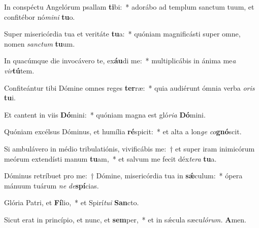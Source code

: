 \item In conspéctu Angelórum psallam \textbf{ti}bi:~* adorábo ad templum sanctum tuum, et confitébor nó\textit{mini} \textbf{tu}o.
\item Super misericórdia tua et veritáte \textbf{tu}a:~* quóniam magnificásti super omne, nomen \textit{sanctum} \textbf{tu}um.
\item In quacúmque die invocávero te, ex\textbf{áu}di me:~* multiplicábis in ánima me\hspace*{0.03em}\textit{a} \textit{vir}\textbf{tú}tem.
\item Confiteántur tibi Dómine omnes reges \textbf{ter}ræ:~* quia audiérunt ómnia verba \textit{oris} \textbf{tu}i.
\item Et cantent in viis \textbf{Dó}mini:~* quóniam magna est gló\textit{ria} \textbf{Dó}mini.
\item Quóniam excélsus Dóminus, et humília \textbf{ré}spicit:~* et alta a lon\textit{ge} \textit{co}\textbf{gnó}scit.
\item Si ambulávero in médio tribulatiónis, vivificábis me:~† et super iram inimicórum meórum extendísti manum \textbf{tu}am,~* et salvum me fecit déx\hspace*{0.01em}\textit{tera} \textbf{tu}a.
\item Dóminus retríbuet pro me:~† Dómine, misericórdia tua in \textbf{sǽ}culum:~* ópera mánuum tuárum \textit{ne} \textit{de}\textbf{spí}cias.
\item Glória Patri, et \textbf{Fí}lio,~* et Spirí\hspace{0.03em}\textit{tui} \textbf{San}cto.
\item Sicut erat in princípio, et nunc, et \textbf{sem}per,~* et in sǽcula sæcu\hspace*{0.03em}\textit{lórum.} \textbf{A}men.